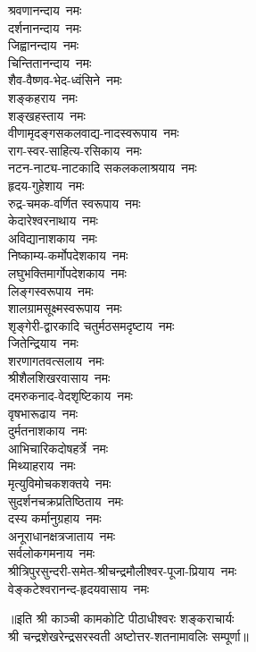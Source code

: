 \begin{flushleft}
\begin{multicols}{2}
श्रवणानन्दाय~नमः\\
दर्शनानन्दाय~नमः\\
जिह्वानन्दाय~नमः\\
चिन्तितानन्दाय~नमः\\
शैव-वैष्णव-भेद-ध्वंसिने~नमः\\
शङ्कहराय~नमः\hfill{}\\
शङ्खहस्ताय~नमः\\
वीणामृदङ्गसकलवाद्य-नादस्वरूपाय~नमः\\
राग-स्वर-साहित्य-रसिकाय~नमः\\
नटन-नाट्य-नाटकादि सकलकलाश्रयाय~नमः\\
हृदय-गुहेशाय~नमः\\
रुद्र-चमक-वर्णित स्वरूपाय~नमः\\
केदारेश्वरनाथाय~नमः\\
अविद्यानाशकाय~नमः\\
निष्काम्य-कर्मोपदेशकाय~नमः\\
लघुभक्तिमार्गोपदेशकाय~नमः\hfill{}\\
लिङ्गस्वरूपाय~नमः\\
शालग्रामसूक्ष्मस्वरूपाय~नमः\\
शृङ्गेरी-द्वारकादि चतुर्मठसमदृष्टाय~नमः\\
जितेन्द्रियाय~नमः\\
शरणागतवत्सलाय~नमः\\
श्रीशैलशिखरवासाय~नमः\\
दमरुकनाद-वेदशृष्टिकाय~नमः\\
वृषभारूढाय~नमः\\
दुर्मतनाशकाय~नमः\\
आभिचारिकदोषहर्त्रे~नमः\hfill{}\\
मिथ्याहराय~नमः\\
मृत्युविमोचकशक्तये~नमः\\
सुदर्शनचक्रप्रतिष्ठिताय~नमः\\
दस्य कर्मानुग्रहाय~नमः\\
अनूराधानक्षत्रजाताय~नमः\\
सर्वलोकगमनाय~नमः\\
श्रीत्रिपुरसुन्दरी-समेत-श्रीचन्द्रमौलीश्वर-पूजा-प्रियाय~नमः\\
वेङ्कटेश्वरानन्द-हृदयवासाय~नमः\\
\end{multicols}
\end{flushleft}
॥इति श्री काञ्ची कामकोटि पीठाधीश्वरः शङ्कराचार्यः\\ श्री चन्द्रशेखरेन्द्रसरस्वती अष्टोत्तर-शतनामावलिः सम्पूर्णा॥
